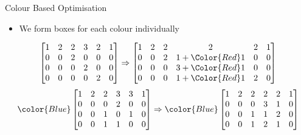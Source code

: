\begin{frame}{Colour Based Optimisation}
	\begin{itemize}
		\item We form boxes for each colour individually
	\end{itemize}
	\begin{equation*}

     \begin{bmatrix}
     1&2&2&3&2&1\\
  0&0&2&0&0&0\\
  0&0&0&2&0&0\\
  0&0&0&0&2&0
     \end{bmatrix} \Rightarrow
     \begin{bmatrix}
     1&2&2&2&2&1\\
	     0&0&2&1+\Color{Red}1&0&0\\
	     0&0&0&3+\Color{Red}1&0&0\\
	     0&0&0&1+\Color{Red}1&2&0
     \end{bmatrix}


	\end{equation*}
	\begin{equation*}
\color{Blue}
    \begin{bmatrix}
        1&2&2&3&3&1\\
        0&0&0&2&0&0\\
        0&0&1&0&1&0\\
        0&0&1&1&0&0\\
    \end{bmatrix}\Rightarrow
\color{Blue}
    \begin{bmatrix}
        1&2&2&2&2&1\\
        0&0&0&3&1&0\\
        0&0&1&1&2&0\\
        0&0&1&2&1&0\\
    \end{bmatrix}
	\end{equation*}

\end{frame}
